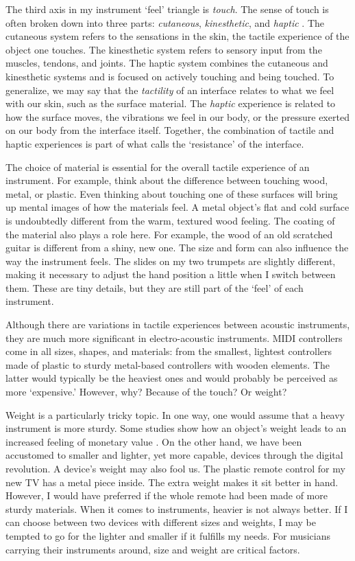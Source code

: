 The third axis in my instrument `feel' triangle is \emph{touch}. The sense of touch is often broken down into three parts: \emph{cutaneous}, \emph{kinesthetic}, and \emph{haptic} \citep[p. 148]{weiner_handbook_2003}. The cutaneous system refers to the sensations in the skin, the tactile experience of the object one touches. The kinesthetic system refers to sensory input from the muscles, tendons, and joints. The haptic system combines the cutaneous and kinesthetic systems and is focused on actively touching and being touched. To generalize, we may say that the \emph{tactility} of an interface relates to what we feel with our skin, such as the surface material. The \emph{haptic} experience is related to how the surface moves, the vibrations we feel in our body, or the pressure exerted on our body from the interface itself.
Together, the combination of tactile and haptic experiences is part of what \citet{wang_artful_2018} calls the `resistance' of the interface.

The choice of material is essential for the overall tactile experience of an instrument. For example, think about the difference between touching wood, metal, or plastic. Even thinking about touching one of these surfaces will bring up mental images of how the materials feel. A metal object's flat and cold surface is undoubtedly different from the warm, textured wood feeling. The coating of the material also plays a role here. For example, the wood of an old scratched guitar is different from a shiny, new one. The size and form can also influence the way the instrument feels. The slides on my two trumpets are slightly different, making it necessary to adjust the hand position a little when I switch between them. These are tiny details, but they are still part of the `feel' of each instrument.

Although there are variations in tactile experiences between acoustic instruments, they are much more significant in electro-acoustic instruments. MIDI controllers come in all sizes, shapes, and materials: from the smallest, lightest controllers made of plastic to sturdy metal-based controllers with wooden elements. The latter would typically be the heaviest ones and would probably be perceived as more `expensive.' However, why? Because of the touch? Or weight?

Weight is a particularly tricky topic. In one way, one would assume that a heavy instrument is more sturdy. Some studies show how an object's weight leads to an increased feeling of monetary value \citep{jostmann_weight_2009}. On the other hand, we have been accustomed to smaller and lighter, yet more capable, devices through the digital revolution. A device's weight may also fool us. The plastic remote control for my new TV has a metal piece inside. The extra weight makes it sit better in hand. However, I would have preferred if the whole remote had been made of more sturdy materials. When it comes to instruments, heavier is not always better. If I can choose between two devices with different sizes and weights, I may be tempted to go for the lighter and smaller if it fulfills my needs. For musicians carrying their instruments around, size and weight are critical factors.

